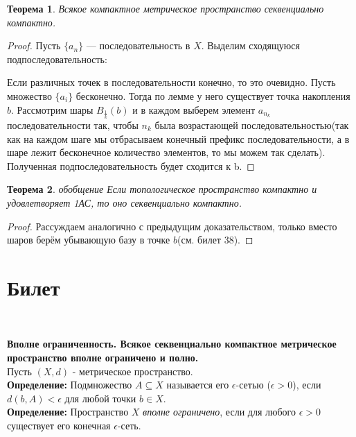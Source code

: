 \documentclass[a4paper,100pt]{article}
\theoremstyle{indented}
\newtheorem{theorem}{Теорема}
\begin{document}
     \begin{theorem}
         Всякое компактное метрическое пространство секвенциально компактно.
     \end{theorem}
     
     \begin{proof}
         Пусть $\{a_n\}$ --- последовательность в $X$. Выделим сходящуюся подпоследовательность:
         
         Если различных точек в последовательности конечно, то это очевидно. Пусть множество $\{a_i\}$ бесконечно. Тогда по лемме у него существует точка накопления $b$. Рассмотрим шары $B_\frac1k(b)$ и в каждом выберем элемент $a_{n_k}$ последовательности так, чтобы $n_k$ была возрастающей последовательностью(так как на каждом шаге мы отбрасываем конечный префикс последовательности, а в шаре лежит бесконечное количество элементов, то мы можем так сделать). Полученная подпоследовательность будет сходится к b.
     \end{proof}
     
     \begin{theorem}{обобщение}
         Если топологическое пространство компактно и удовлетворяет 1АС, то оно секвенциально компактно.
     \end{theorem}
     
     \begin{proof}
         Рассуждаем аналогично с предыдущим доказательством, только вместо шаров берём убывающую базу в точке $b$(см. билет 38).
     \end{proof}

\section{Билет} \

\medskip

\textbf{Вполне ограниченность. Всякое секвенциально компактное метрическое пространство вполне ограничено и полно.}\\

Пусть $(X, d)$ - метрическое пространство.
\\

\textbf{Определение:} Подмножество $A \subseteq X$ называется его $\epsilon$-сетью ($\epsilon > 0$), если $d(b, A) < \epsilon$ для любой точки $b \in X$.
\\

\textbf{Определение:} Пространство $X$ \textit{вполне ограничено}, если для любого $\epsilon > 0$ существует его конечная $\epsilon$-сеть.
\\
\end{document}
